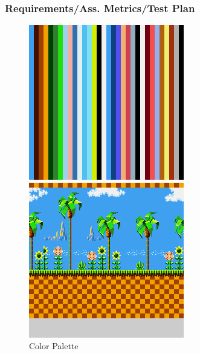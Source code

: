 \documentclass{beamer}
\begin{document}
\begin{frame}
    \frametitle{Requirements/Ass. Metrics/Test Plan}
    \begin{figure}[H]
        \centering
        \begin{minipage}[H]{0.45\linewidth}
            \centering
            \includegraphics[width=\textwidth]{../images/palette.png}
            \caption{Color Palette}
            \label{fig:palette}
        \end{minipage}
        \hfill
        \begin{minipage}[H]{0.45\linewidth}
            \centering
            \includegraphics[width=\textwidth]{../images/screen.png}

\end{minipage}
\end{figure}
\end{frame}
\end{document}
